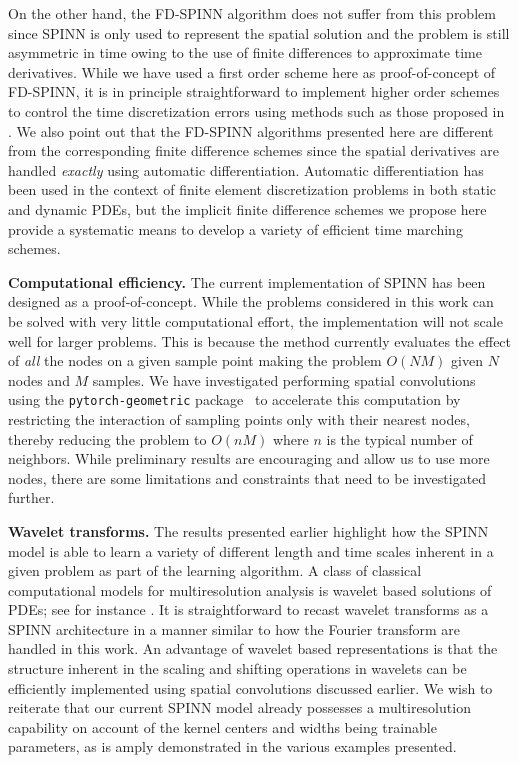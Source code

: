 \documentclass[12pt]{article}
\begin{document}
On the other hand, the FD-SPINN algorithm does not suffer from this problem since SPINN is only used to represent the spatial solution and the problem is still asymmetric in time owing to the use of finite differences to approximate time derivatives. While we have used a first order scheme here as proof-of-concept of FD-SPINN, it is in principle straightforward to implement higher order schemes to control the time discretization errors using methods such as those proposed in \cite{SCL2020pre}. We also point out that the FD-SPINN algorithms presented here are different from the corresponding finite difference schemes since the spatial derivatives are handled \emph{exactly} using automatic differentiation. Automatic differentiation has been used in the context of finite element discretization problems in both static \cite{TRRB2002} and dynamic \cite{RG2014} PDEs, but the implicit finite difference schemes we propose here provide a systematic means to develop a variety of efficient time marching schemes.

\textbf{Computational efficiency.} The current implementation of SPINN has been designed as a proof-of-concept.  While the problems considered in this work can be solved with very little computational effort, the implementation will not scale well for larger problems. This is because the method currently evaluates the effect of \emph{all} the nodes on a given sample point making the problem $O(NM)$ given $N$ nodes and $M$ samples.  We have investigated performing spatial convolutions using the \texttt{pytorch-geometric} package~\cite{pytorch_geometric} to accelerate this computation by restricting the interaction of sampling points only with their nearest nodes, thereby reducing the problem to $O(nM)$ where $n$ is the typical number of neighbors.  While preliminary results are encouraging and allow us to use more nodes, there are some limitations and constraints that need to be investigated further. 

\textbf{Wavelet transforms.} The results presented earlier highlight how the SPINN model is able to learn a variety of different length and time scales inherent in a given problem as part of the learning algorithm. A class of classical computational models for multiresolution analysis is wavelet based solutions of PDEs; see for instance \cite{WA94}. It is straightforward to recast wavelet transforms as a SPINN architecture in a manner similar to how the Fourier transform are handled in this work. An advantage of wavelet based representations is that the structure inherent in the scaling and shifting operations in wavelets can be efficiently implemented using spatial convolutions discussed earlier. We wish to reiterate that our current SPINN model already possesses a multiresolution capability on account of the kernel centers and widths being trainable parameters, as is amply demonstrated in the various examples presented.
\end{document}
